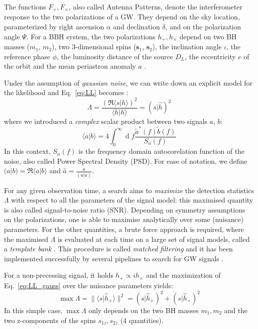 \documentclass[twocolumn,showpacs,preprintnumbers,nofootinbib,prd,
superscriptaddress,10pt]{revtex4-2}
\renewcommand{\d}[1]{\ensuremath{\operatorname{d}\!{#1}}}
\newcommand{\scalar}[2]{\langle #1|#2 \rangle}
\newcommand{\rescalar}[2]{( #1 |#2 )}
\begin{document}
The functions $F_+, F_\times$, also called Antenna Patterns, denote the interferometer response to the two polarizations of a GW. They depend on the sky location, parameterized by right ascension $\alpha$ and declination $\delta$, and on the polarization angle $\Psi$. 
For a BBH system, the two polarizations $h_+, h_\times$ depend on two BH masses ($m_1$, $m_2$), two 3-dimensional spins ($\mathbf{s}_1$, $\mathbf{s}_2$), the inclination angle $\iota$, the reference phase $\phi$, the luminosity distance of the source $D_L$, the eccentricity $e$ of the orbit and the mean periastron anomaly $a$ \cite{Sathyaprakash_2009}.

Under the assumption of {\it gaussian noise}, we can write down an explicit model for the likelihood and Eq.~\eqref{eq:LL} becomes \cite{Creighton_book, Maggiore:2007ulw}:
\begin{equation}\label{eq:LL_gauss}
	\Lambda = \frac{\left(\Re\scalar{s}{h}\right)^2}{\scalar{h}{h}} = \rescalar{s}{\hat{h}}^2
\end{equation}
where we introduced a {\it complex} scalar product between two signals $a$, $b$:
\begin{equation} \label{eq:scalar_product}
	\scalar{a}{b} = 4 \int_{0}^{\infty} \d{f} \frac{\tilde{a}^*(f) \tilde{b}(f)}{S_n(f)}
\end{equation}
In this context, $S_n(f)$ is the frequency domain autocorelation function of the noise, also called Power Spectral Density (PSD).
For ease of notation, we define ${\rescalar{a}{b} = \Re\scalar{a}{b}}$ and ${\hat{a} = \frac{a}{\rescalar{a}{a}}}$.

For any given observation time, a search aims to {\it maximize} the detection statistics $\Lambda$ with respect to all the parameters of the signal model: this maximised quantity is also called signal-to-noise ratio (SNR).
Depending on symmetry assumptions on the polarizations, one is able to maximise analytically over some (nuisance) parameters.
For the other quantities, a brute force approach is required, where the maximised $\Lambda$ is evaluated at each time on a large set of signal models, called a {\it template bank} \cite{PhysRevD.77.104017, Mukherjee:2018yra}.
This procedure is called {\it matched filtering} and it has been implemented successfully by several pipelines to search for GW signals \cite{Privitera:2013xza, Usman:2015kfa, Capano:2016dsf, PhysRevD.95.042001, gstlal_paper2, Aubin:2020goo, Chu:2020pjv}.

For a non-precessing signal, it holds $h_+ \propto ih_\times$ and the maximization of Eq.~\eqref{eq:LL_gauss} over the nuisance parameters yields:
\begin{equation}\label{eq:std_snr}
	\max \Lambda = \lVert \scalar{s}{\hat{h}_+} \rVert^2 = \rescalar{s}{\hat{h}_+}^2 + \rescalar{s}{\hat{h}_\times}^2
\end{equation}
In this simple case, $\max\Lambda$ only depends on the two BH masses $m_1, m_2$ and the two z-components of the spins $s_{1z}, s_{2z}$ (4 quantities).
\end{document}
